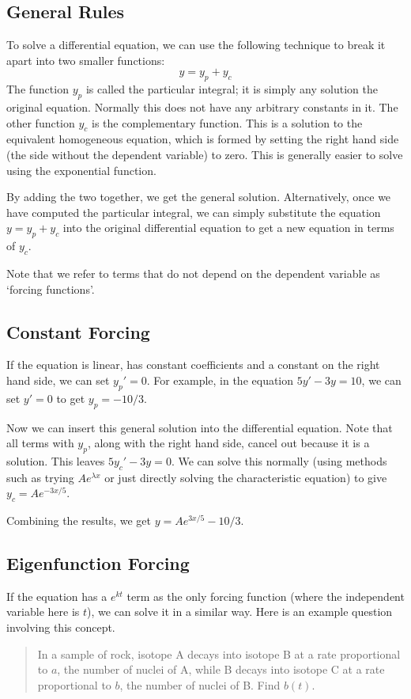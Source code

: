\subsection{General Rules}
To solve a differential equation, we can use the following technique to break it apart into two smaller functions:
\[ y = y_p + y_c \]
The function $y_p$ is called the particular integral; it is simply any solution
the original equation. Normally this does not have any arbitrary constants in it. The other function $y_c$ is the complementary function. This is a solution to the equivalent homogeneous equation, which is formed by setting the right hand side (the side without the dependent variable) to zero. This is generally easier to solve using the exponential function.

By adding the two together, we get the general solution. Alternatively, once we have computed the particular integral, we can simply substitute the equation $y = y_p + y_c$ into the original differential equation to get a new equation in terms of $y_c$.

Note that we refer to terms that do not depend on the dependent variable as `forcing functions'.

\subsection{Constant Forcing}
If the equation is linear, has constant coefficients and a constant on the right hand side, we can set $y_p' = 0$. For example, in the equation $5y' - 3y = 10$, we can set $y' = 0$ to get $y_p = -10/3$.

Now we can insert this general solution into the differential equation. Note that all terms with $y_p$, along with the right hand side, cancel out because it is a solution. This leaves $5y_c' - 3y = 0$. We can solve this normally (using methods such as trying $Ae^{\lambda x}$ or just directly solving the characteristic equation) to give $y_c = Ae^{-3x/5}$.

Combining the results, we get $y = Ae^{3x/5} - 10/3$.

\subsection{Eigenfunction Forcing}
If the equation has a $e^{kt}$ term as the only forcing function (where the independent variable here is $t$), we can solve it in a similar way. Here is an example question involving this concept.

\begin{quote}
	In a sample of rock, isotope A decays into isotope B at a rate proportional to $a$, the number of nuclei of A, while B decays into isotope C at a rate proportional to $b$, the number of nuclei of B. Find $b(t)$.
\end{quote}

